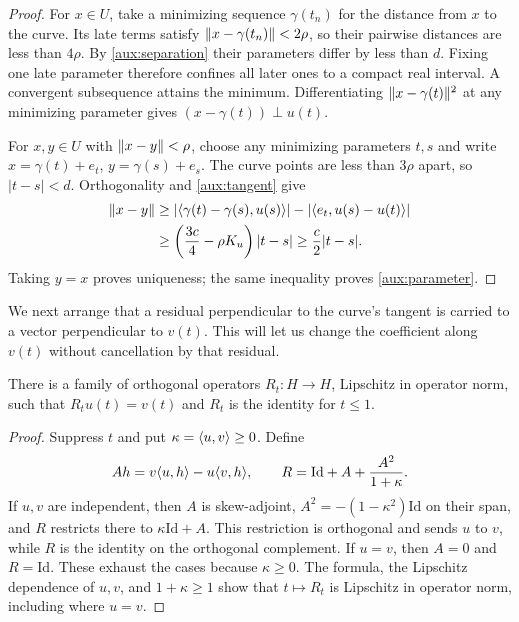 \begin{proof}
For $x\in U$, take a minimizing sequence $\gamma(t_n)$ for the
distance from $x$ to the curve. Its late terms satisfy
$\lVert x-\gamma(t_n)\rVert<2\rho$, so their pairwise distances are less
than $4\rho$. By \eqref{aux:separation} their parameters differ by
less than $d$. Fixing one late parameter therefore confines all later
ones to a compact real interval. A convergent subsequence attains the
minimum. Differentiating $\lVert x-\gamma(t)\rVert^2$ at any minimizing
parameter gives $(x-\gamma(t))\perp u(t)$.

For $x,y\in U$ with $\lVert x-y\rVert<\rho$, choose any minimizing
parameters $t,s$ and write $x=\gamma(t)+e_t$,
$y=\gamma(s)+e_s$. The curve points are less than $3\rho$ apart,
so $|t-s|<d$. Orthogonality and \eqref{aux:tangent} give
\begin{align*}
 \lVert x-y\rVert
 &\ge |\langle \gamma(t)-\gamma(s),u(s)\rangle|
       -|\langle e_t,u(s)-u(t)\rangle|\\
 &\ge\left(\frac{3c}{4}-\rho K_u\right)|t-s|
 \ge\frac c2|t-s|.
\end{align*}
Taking $y=x$ proves uniqueness; the same inequality proves
\eqref{aux:parameter}.
\end{proof}

We next arrange that a residual perpendicular to the curve's tangent
is carried to a vector perpendicular to $v(t)$. This will let us change
the coefficient along $v(t)$ without cancellation by that residual.

\begin{lemma}\label{aux:rotation}
There is a family of orthogonal operators $R_t:H\to H$, Lipschitz
in operator norm, such that $R_tu(t)=v(t)$ and $R_t$ is the identity
for $t\le1$.
\end{lemma}

\begin{proof}
Suppress $t$ and put $\kappa=\langle u,v\rangle\ge0$. Define
\[
 Ah=v\langle u,h\rangle-u\langle v,h\rangle,
 \qquad R=\mathrm{Id}+A+\frac{A^2}{1+\kappa}.
\]
If $u,v$ are independent, then $A$ is skew-adjoint,
$A^2=-(1-\kappa^2)\mathrm{Id}$ on their span, and $R$ restricts there
to $\kappa\mathrm{Id}+A$. This restriction is orthogonal and sends
$u$ to $v$, while $R$ is the identity on the orthogonal complement.
If $u=v$, then $A=0$ and $R=\mathrm{Id}$. These exhaust the cases
because $\kappa\ge0$. The formula, the Lipschitz dependence of
$u,v$, and $1+\kappa\ge1$ show that $t\mapsto R_t$ is Lipschitz
in operator norm, including where $u=v$.
\end{proof}

